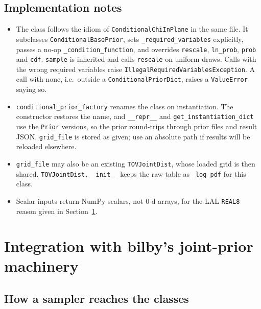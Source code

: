 \documentclass[11pt,a4paper]{article}
\newcommand{\code}[1]{\texttt{#1}}
\begin{document}
\subsection{Implementation notes}

\begin{itemize}
  \item The class follows the idiom of \code{ConditionalChiInPlane} in the same
    file. It subclasses \code{ConditionalBasePrior}, sets
    \code{\_required\_variables} explicitly, passes a no-op
    \code{\_condition\_function}, and overrides \code{rescale},
    \code{ln\_prob}, \code{prob} and \code{cdf}. \code{sample} is inherited
    and calls \code{rescale} on uniform draws. Calls with the wrong required
    variables raise \code{IllegalRequiredVariablesException}. A call with none,
    i.e.\ outside a \code{ConditionalPriorDict}, raises a \code{ValueError}
    saying so.
  \item \code{conditional\_prior\_factory} renames the class on instantiation.
    The constructor restores the name, and \code{\_\_repr\_\_} and
    \code{get\_instantiation\_dict} use the \code{Prior} versions, so the prior
    round-trips through prior files and result JSON. \code{grid\_file} is stored
    as given; use an absolute path if results will be reloaded elsewhere.
  \item \code{grid\_file} may also be an existing \code{TOVJointDist}, whose
    loaded grid is then shared. \code{TOVJointDist.\_\_init\_\_} keeps the raw
    table as \code{\_log\_pdf} for this class.
  \item Scalar inputs return NumPy scalars, not 0-d arrays, for the LAL
    \code{REAL8} reason given in Section~\ref{sec:machinery}.
\end{itemize}

\section{Integration with bilby's joint-prior machinery}
\label{sec:machinery}

\subsection{How a sampler reaches the classes}
\end{document}
